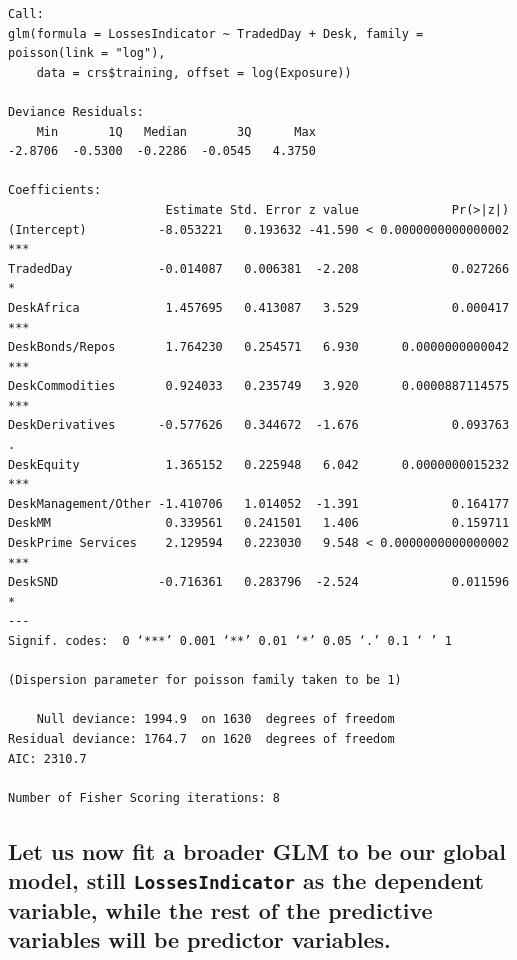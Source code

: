 \documentclass[
]{article}
\begin{document}
\begin{verbatim}
Call:
glm(formula = LossesIndicator ~ TradedDay + Desk, family = poisson(link = "log"), 
    data = crs$training, offset = log(Exposure))

Deviance Residuals: 
    Min       1Q   Median       3Q      Max  
-2.8706  -0.5300  -0.2286  -0.0545   4.3750  

Coefficients:
                      Estimate Std. Error z value             Pr(>|z|)    
(Intercept)          -8.053221   0.193632 -41.590 < 0.0000000000000002 ***
TradedDay            -0.014087   0.006381  -2.208             0.027266 *  
DeskAfrica            1.457695   0.413087   3.529             0.000417 ***
DeskBonds/Repos       1.764230   0.254571   6.930      0.0000000000042 ***
DeskCommodities       0.924033   0.235749   3.920      0.0000887114575 ***
DeskDerivatives      -0.577626   0.344672  -1.676             0.093763 .  
DeskEquity            1.365152   0.225948   6.042      0.0000000015232 ***
DeskManagement/Other -1.410706   1.014052  -1.391             0.164177    
DeskMM                0.339561   0.241501   1.406             0.159711    
DeskPrime Services    2.129594   0.223030   9.548 < 0.0000000000000002 ***
DeskSND              -0.716361   0.283796  -2.524             0.011596 *  
---
Signif. codes:  0 ‘***’ 0.001 ‘**’ 0.01 ‘*’ 0.05 ‘.’ 0.1 ‘ ’ 1

(Dispersion parameter for poisson family taken to be 1)

    Null deviance: 1994.9  on 1630  degrees of freedom
Residual deviance: 1764.7  on 1620  degrees of freedom
AIC: 2310.7

Number of Fisher Scoring iterations: 8
\end{verbatim}

\subsection{Let us now fit a broader GLM to be our global model, still \texttt{LossesIndicator} as the dependent variable, while the rest of the predictive variables will be predictor variables.}
\label{ssec:GLM estimation results}

\small
\end{document}
